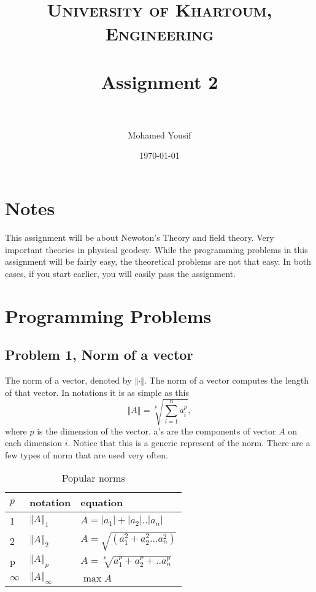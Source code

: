 \documentclass[paper=a4, fontsize=11pt]{scrartcl} %
\title{	
\normalfont \normalsize 
\textsc{University of Khartoum, Engineering} \\ [25pt] %
\horrule{0.5pt} \\[0.4cm] %
\huge Assignment 2 \\ %
\horrule{2pt} \\[0.5cm] %
}
\author{Mohamed Yousif} %
\date{\normalsize\today} %
\numberwithin{equation}{section} %
\numberwithin{figure}{section} %
\numberwithin{table}{section} %
\begin{document}
\maketitle %


\section*{Notes}
This assignment will be about Newoton's Theory and field theory. Very important theories in physical geodesy. While the programming problems in this assignment will be fairly easy, the theoretical problems are not that easy. In both cases, if you start earlier, you will easily pass the assignment.


\section{Programming Problems}
\subsection{Problem 1, Norm of a vector}
The norm of a vector, denoted by $\left \Vert \cdot \right \Vert $. The norm of a vector computes the length of that vector. In notations it is as simple as this 
\begin{equation}
\left \Vert A \right \Vert = \sqrt[p]{\sum_{i=1}^{n} a_i^p},
\end{equation}
where $p$ is the dimension of the vector. a's are the components of vector $A$ on each dimension $i$. Notice that this is a generic represent of the norm. There are a few types of norm that are used very often.

\begin{table}
	\centering
	\caption{Popular norms}
	\label{table:norm}
	\begin{tabular}{@{}lll@{}}
		\toprule
		$p$ & notation & equation\\
		\midrule
		1 & $\left \Vert A \right \Vert_1 $ & $A = |a_1| + |a_2| .. |a_n|$\\
		2 & $\left \Vert A \right \Vert_2 $ & $ A = \sqrt{(a_1^2 + a_2^2 ... a_n^2)}$\\
		p & $\left \Vert A \right \Vert_p $ & $ A = \sqrt[p]{a_1^p + a_2^p + .. a_n^p}$\\
		$\infty$ & $\left \Vert A \right \Vert_{\infty} $ & $\max A$\\
		\bottomrule
	\end{tabular}
	
\end{table}
\end{document}
